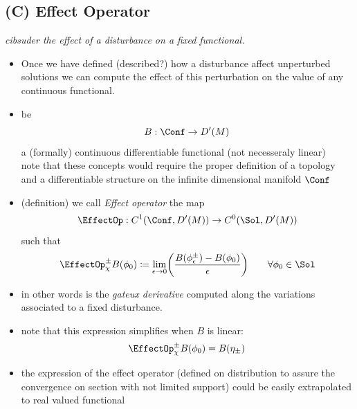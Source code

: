 \documentclass[a4paper,11pt]{scrartcl}
\begin{document}
    \subsection{(C) Effect Operator}
    \emph{cibsuder the effect of a disturbance on a fixed functional.}
    \begin{itemize}
        \item Once we have defined (described?) how a disturbance affect unperturbed solutions we can compute the effect of this perturbation on the value of any continuous functional.
        \item be
        $$B: \Conf \rightarrow D'(M)$$
        a (formally) continuous differentiable functional (not necesseraly linear)\\
        note that these concepts would require the proper definition of a topology and a differentiable structure on the infinite dimensional manifold $\Conf$
        \item (definition) we call \emph{Effect operator} the map
        $$\EffectOp : C^1(\Conf,D'(M)) \rightarrow C^0(\Sol,D'(M))$$
        such that
        $$    \EffectOp_\chi^\pm B ( \phi_0) \coloneqq \lim_{\epsilon \rightarrow 0} \biggr( \frac{B(\phi_\epsilon^\pm) - B (\phi_0)}{\epsilon} \biggr)  \qquad \forall \phi_0 \in \Sol $$
        \item in other words is the \emph{gateux derivative} computed along the variations associated to a fixed disturbance.
        \item note that this expression simplifies when $B$ is linear:
        $$ \EffectOp_\chi^\pm B ( \phi_0) =  B(\eta_\pm) $$
        \item the expression of the effect operator (defined on distribution to assure the convergence on section with not limited support)
        could be easily extrapolated to real valued  functional

    \end{itemize}
\end{document}
